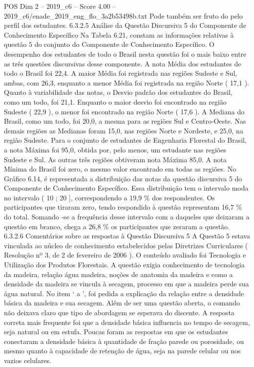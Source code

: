 \begin{textsample}{POS Dim 2 – 2019\_c6 – Score 4.00 – 2019\_c6/enade\_2019\_eng\_flo\_3a2b53498b.txt}
Pode também ser fruto do pelo perfil dos estudantes. 6.3.2.5 Análise da Questão Discursiva 5 do Componente de Conhecimento Específico Na Tabela 6.21, constam as informações relativas à questão 5 do conjunto do Componente de Conhecimento Específico.
O desempenho dos estudantes de todo o Brasil nesta questão foi o mais baixo entre as três questões discursivas desse componente.
A nota Média dos estudantes de todo o Brasil foi 22,4.
A maior Média foi registrada nas regiões Sudeste e Sul, ambas, com 26,3, enquanto a menor Média foi registrada na região Norte ( 17,1 ).
Quanto à variabilidade das notas, o Desvio padrão dos estudantes do Brasil, como um todo, foi 21,1.
Enquanto o maior desvio foi encontrado na região Sudeste ( 22,9 ), o menor foi encontrado na região Norte ( 17,6 ).
A Mediana do Brasil, como um todo, foi 20,0, a mesma para as regiões Sul e Centro-Oeste.
Nas demais regiões as Medianas foram 15,0, nas regiões Norte e Nordeste, e 25,0, na região Sudeste.
Para o conjunto de estudantes de Engenharia Florestal do Brasil, a nota Máxima foi 95,0, obtida por, pelo menos, um estudante nas regiões Sudeste e Sul.
As outras três regiões obtiveram nota Máxima 85,0.
A nota Mínima do Brasil foi zero, o mesmo valor encontrado em todas as regiões.
No Gráfico 6.14, é representada a distribuição das notas da questão discursiva 5 do Componente de Conhecimento Específico.
Essa distribuição tem o intervalo moda no intervalo ( 10 ; 20 ], correspondendo a 19,9 \% dos respondentes.
Os participantes que tiraram zero, tendo respondido à questão representam 16,7 \% do total.
Somando -se a frequência desse intervalo com a daqueles que deixaram a questão em branco, chega a 26,8 \% os participantes que zeraram a questão. 6.3.2.6 Comentários sobre as respostas à Questão Discursiva 5 A Questão 5 estava vinculada ao núcleo de conhecimento estabelecidos pelas Diretrizes Curriculares ( Resolução nº 3, de 2 de fevereiro de 2006 ).
O conteúdo avaliado foi Tecnologia e Utilização dos Produtos Florestais.
A questão exigia conhecimento de tecnologia da madeira, relação água madeira, noções de anatomia da madeira e como a densidade da madeira se vincula à secagem, processo em que a madeira perde sua água natural.
No item ‘ a ’, foi pedida a explicação da relação entre a densidade básica da madeira e sua secagem.
Além de ser uma questão aberta, o comando não deixava claro que tipo de abordagem se esperava do discente.
A resposta correta mais frequente foi que a densidade básica influencia no tempo de secagem, seja natural ou em estufa.
Poucas foram as respostas em que os estudantes conectaram a densidade básica à quantidade de fração parede ou porosidade, ou mesmo quanto à capacidade de retenção de água, seja na parede celular ou nos vazios celulares.

\end{textsample}
